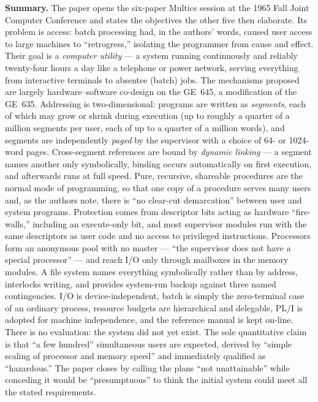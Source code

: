\textbf{Summary.} The paper opens the six-paper Multics session at the 1965 Fall Joint
Computer Conference and states the objectives the other five then elaborate. Its problem is
access: batch processing had, in the authors' words, caused user access to large machines to
``retrogress,'' isolating the programmer from cause and effect. Their goal is a
\emph{computer utility} --- a system running continuously and reliably twenty-four hours a
day like a telephone or power network, serving everything from interactive terminals to
absentee (batch) jobs. The mechanisms proposed are largely hardware--software co-design on
the GE~645, a modification of the GE~635. Addressing is two-dimensional: programs are
written as \emph{segments}, each of which may grow or shrink during execution (up to roughly
a quarter of a million segments per user, each of up to a quarter of a million words), and
segments are independently \emph{paged} by the supervisor with a choice of 64- or 1024-word
pages. Cross-segment references are bound by \emph{dynamic linking} --- a segment names
another only symbolically, binding occurs automatically on first execution, and afterwards
runs at full speed. Pure, recursive, shareable procedures are the normal mode of
programming, so that one copy of a procedure serves many users and, as the authors note,
there is ``no clear-cut demarcation'' between user and system programs. Protection comes
from descriptor bits acting as hardware ``fire-walls,'' including an execute-only bit, and
most supervisor modules run with the same descriptors as user code and no access to
privileged instructions. Processors form an anonymous pool with no master --- ``the
supervisor does not have a special processor'' --- and reach I/O only through mailboxes in
the memory modules. A file system names everything symbolically rather than by address,
interlocks writing, and provides system-run backup against three named contingencies. I/O
is device-independent, batch is simply the zero-terminal case of an ordinary process,
resource budgets are hierarchical and delegable, PL/I is adopted for machine independence,
and the reference manual is kept on-line. There is no evaluation: the system did not yet
exist. The sole quantitative claim is that ``a few hundred'' simultaneous users are expected,
derived by ``simple scaling of processor and memory speed'' and immediately qualified as
``hazardous.'' The paper closes by calling the plans ``not unattainable'' while conceding it
would be ``presumptuous'' to think the initial system could meet all the stated requirements.

